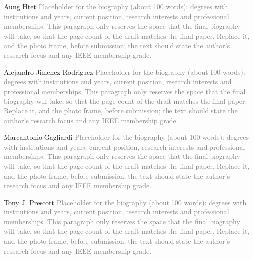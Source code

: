 \documentclass[journal]{IEEEtran}
\makeatletter
\newif\ifdraftmarkers
\newcommand{\listofcitationsneeded}{%
  \IfFileExists{\jobname.cnd}{\begin{enumerate}\setlength{\itemsep}{1pt}\small\@starttoc{cnd}\end{enumerate}}%
    {\@starttoc{cnd}(compile again to list them)}}
\newcommand{\photoplaceholder}{\fbox{\parbox[c][1.15in][c]{0.9in}{\centering\footnotesize\textcolor{gray}{photo}}}}
\makeatother
\begin{document}
\newcommand{\bioplaceholder}{\textcolor{gray}{Placeholder for the biography (about 100 words): degrees with institutions and years, current position, research interests and professional memberships. This paragraph only reserves the space that the final biography will take, so that the page count of the draft matches the final paper. Replace it, and the photo frame, before submission; the text should state the author's research focus and any IEEE membership grade.}}
\begin{IEEEbiography}[\photoplaceholder]{Aung Htet}
\bioplaceholder
\end{IEEEbiography}
\begin{IEEEbiography}[\photoplaceholder]{Alejandro Jimenez-Rodriguez}
\bioplaceholder
\end{IEEEbiography}
\begin{IEEEbiography}[\photoplaceholder]{Marcantonio Gagliardi}
\bioplaceholder
\end{IEEEbiography}
\begin{IEEEbiography}[\photoplaceholder]{Tony J. Prescott}
\bioplaceholder\label{paper:end}
\end{IEEEbiography}

\ifdraftmarkers
\clearpage
\onecolumn
\section*{Draft only: citations to be sourced}
The following placeholders mark claims that need a reference beyond the reference lists of~\cite{Htet2024} and of the npj draft. This page is not part of the paper and disappears with \texttt{\textbackslash draftmarkersfalse}.
\listofcitationsneeded
\fi
\end{document}
